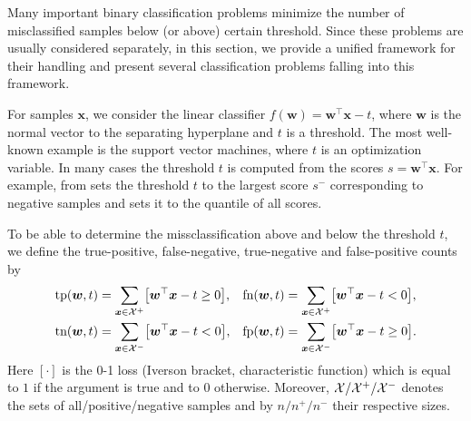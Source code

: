 Many important binary classification problems minimize the number of misclassified samples below (or above) certain threshold. Since these problems are usually considered separately, in this section, we provide a unified framework for their handling and present several classification problems falling into this framework.

For samples $\bm{x}$, we consider the linear classifier $f(\bm{w}) = \bm{w}^\top \bm{x} - t$, where $\bm{w}$ is the normal vector to the separating hyperplane and $t$ is a threshold. The most well-known example is the support vector machines, where $t$ is an optimization variable. In many cases the threshold $t$ is computed from the scores $s = \bm{w}^\top \bm{x}$. For example, \TopPush from \cite{li2014top} sets the threshold $t$ to the largest score $s^-$ corresponding to negative samples and \cite{grill2016learning} sets it to the quantile of all scores.

To be able to determine the missclassification above and below the threshold $t$, we define the true-positive, false-negative, true-negative and false-positive counts by
\begin{equation}\label{eq:defin_counts}
  \begin{aligned}
    \tp(\bm{w}, t) & = \sum_{\bm{x} \in \Xc^+}\Brac[s]{\bm{w}^\top \bm{x} - t \ge 0}, &
    \fn(\bm{w}, t) & = \sum_{\bm{x} \in \Xc^+}\Brac[s]{\bm{w}^\top \bm{x} - t < 0}, \\
    \tn(\bm{w}, t) & = \sum_{\bm{x} \in \Xc^-}\Brac[s]{\bm{w}^\top \bm{x} - t < 0}, &
    \fp(\bm{w}, t) & = \sum_{\bm{x} \in \Xc^-}\Brac[s]{\bm{w}^\top \bm{x} - t \ge 0}.
  \end{aligned}
\end{equation}
Here $[\cdot]$ is the 0-1 loss (Iverson bracket, characteristic function) which is equal to $1$ if the argument is true and to $0$ otherwise. Moreover, $\mathcal{X} / \mathcal{X}^{+} / \mathcal{X}^{-}$ denotes the sets of all/positive/negative samples and by $n / n^{+} / n^{-}$ their respective sizes. 

